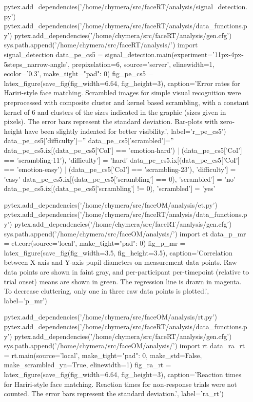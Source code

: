 \begin{pycode}[pe_cs5]
pytex.add_dependencies('/home/chymera/src/faceRT/analysis/signal_detection.py')
pytex.add_dependencies('/home/chymera/src/faceRT/analysis/data_functions.py')
pytex.add_dependencies('/home/chymera/src/faceRT/analysis/gen.cfg')
sys.path.append('/home/chymera/src/faceRT/analysis/')
import signal_detection
data_pe_cs5 = signal_detection.main(experiment='11px-4px-5steps_narrow-angle', prepixelation=6, source='server', elinewidth=1, ecolor='0.3', make_tight={"pad": 0})
fig_pe_cs5 = latex_figure(save_fig(fig_width=6.64, fig_height=3), caption='Error rates for Hariri-style face matching. Scrambled images for simple visual recognition were preprocessed with composite cluster and kernel based scrambling, with a constant kernel of \SI{6}{\pixel} and clusters of the sizes indicated in the graphic (sizes given in pixels). The error bars represent the standard deviation. Bar-plots with zero-height have been slightly indented for better visibility.', label='r_pe_cs5')
data_pe_cs5['difficulty']=''
data_pe_cs5['scrambled']=''
data_pe_cs5.ix[(data_pe_cs5['CoI'] == 'emotion-hard') | (data_pe_cs5['CoI'] == 'scrambling-11'), 'difficulty'] = 'hard'
data_pe_cs5.ix[(data_pe_cs5['CoI'] == 'emotion-easy') | (data_pe_cs5['CoI'] == 'scrambling-23'), 'difficulty'] = 'easy'
data_pe_cs5.ix[(data_pe_cs5['scrambling'] == 0), 'scrambled'] = 'no'
data_pe_cs5.ix[(data_pe_cs5['scrambling'] != 0), 'scrambled'] = 'yes'
\end{pycode}
\begin{pycode}[p_mr]
pytex.add_dependencies('/home/chymera/src/faceOM/analysis/et.py')
pytex.add_dependencies('/home/chymera/src/faceRT/analysis/data_functions.py')
pytex.add_dependencies('/home/chymera/src/faceRT/analysis/gen.cfg')
sys.path.append('/home/chymera/src/faceOM/analysis/')
import et
data_p_mr = et.corr(source='local', make_tight={"pad": 0})
fig_p_mr = latex_figure(save_fig(fig_width=3.5, fig_height=3.5), caption='Correlation between X-axis and Y-axis pupil diameters on measurement data points. Raw data points are shown in faint gray, and per-participant per-timepoint (relative to trial onset) means are shown in green. The regression line is drawn in magenta. To decrease cluttering, only one in three raw data points is plotted.', label='p_mr')
\end{pycode}
\begin{pycode}[ra_rt]
pytex.add_dependencies('/home/chymera/src/faceOM/analysis/rt.py')
pytex.add_dependencies('/home/chymera/src/faceRT/analysis/data_functions.py')
pytex.add_dependencies('/home/chymera/src/faceRT/analysis/gen.cfg')
sys.path.append('/home/chymera/src/faceOM/analysis/')
import rt
data_ra_rt = rt.main(source='local', make_tight={"pad": 0}, make_std=False, make_scrambled_yn=True, elinewidth=1)
fig_ra_rt = latex_figure(save_fig(fig_width=6.64, fig_height=3), caption='Reaction times for Hariri-style face matching. Reaction times for non-response trials were not counted. The error bars represent the standard deviation.', label='ra_rt')
\end{pycode}
